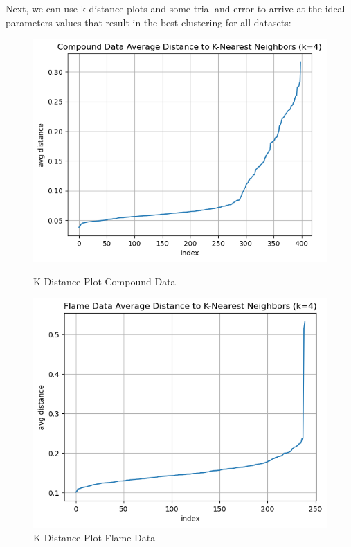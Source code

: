 \documentclass{article}
\begin{document}
Next, we can use k-distance plots and some trial and error to arrive at the ideal parameters values that
result in the best clustering for all datasets:

\begin{figure}[H]
    \centering
    \begin{minipage}[b]{0.49\textwidth}
        \centering
        \includegraphics[width=\textwidth]{k_dist_compound.png}
        \caption{K-Distance Plot Compound Data}
    \end{minipage}
    \hfill
    \begin{minipage}[b]{0.49\textwidth}
        \centering
        \includegraphics[width=\textwidth]{k_dist_flame.png}
        \caption{K-Distance Plot Flame Data}
    \end{minipage}
\end{figure}
\end{document}
